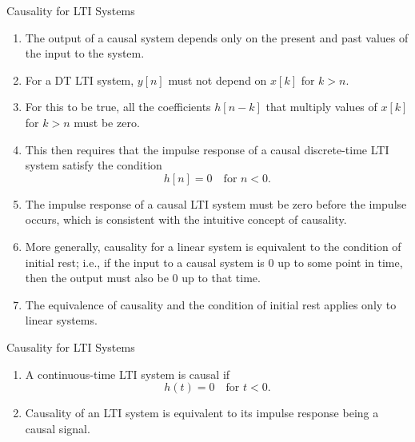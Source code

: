 \begin{frame}{Causality for LTI Systems}

    \begin{enumerate}
        \item The output of a causal system depends only on the present and past values of the input to the system.
        \item For a DT LTI system, $y[n]$ must not depend on $x[k]$ for $k > n$.
        \item For this to be true, all the coefficients $h[n- k]$ that multiply values of $x[k]$ for $k > n$ must be zero.
        \item This then requires that the impulse response of a causal discrete-time LTI system satisfy the condition
            \begin{equation*}
                h[n] = 0\quad \text{for } n < 0.
            \end{equation*}
        \item The impulse response of a causal LTI system must be zero before the impulse occurs, which is consistent with the intuitive concept of causality.
        \item More generally, causality for a linear system is equivalent to the condition of initial rest; i.e., if the input to a causal system is 0 up to some point in time, then the output must also be 0 up to that time.
        \item The equivalence of causality and the condition of \alert{initial rest} applies only to linear systems.
    \end{enumerate}
\end{frame}

\begin{frame}{Causality for LTI Systems}

    \begin{enumerate}
        \item A continuous-time LTI system is causal if
            \begin{equation*}
                h(t) = 0\quad \text{for } t < 0.
            \end{equation*}
        \item Causality of an LTI system is equivalent to its impulse response being a causal signal.
    \end{enumerate}
\end{frame}


